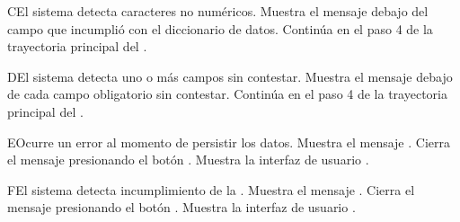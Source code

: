 \begin{UCtrayectoriaA}{C}{El sistema detecta caracteres no numéricos.}
	\UCpaso Muestra el mensaje  debajo del campo que incumplió con el diccionario de datos.
	\UCpaso Continúa en el paso 4 de la trayectoria principal del .
\end{UCtrayectoriaA}

\begin{UCtrayectoriaA}{D}{El sistema detecta uno o más campos sin contestar.}
	\UCpaso Muestra el mensaje  debajo de cada campo obligatorio sin contestar.
	\UCpaso Continúa en el paso 4 de la trayectoria principal del .
\end{UCtrayectoriaA}

\begin{UCtrayectoriaA}{E}{Ocurre un error al momento de persistir los datos.}
	\UCpaso Muestra el mensaje .
	\UCpaso[\UCactor] Cierra el mensaje presionando el botón .
	\UCpaso Muestra la interfaz de usuario .
\end{UCtrayectoriaA}
\begin{UCtrayectoriaA}{F}{El sistema detecta incumplimiento de la  .}
	\UCpaso Muestra el mensaje .
	\UCpaso[\UCactor] Cierra el mensaje presionando el botón .
	\UCpaso Muestra la interfaz de usuario .
\end{UCtrayectoriaA}



